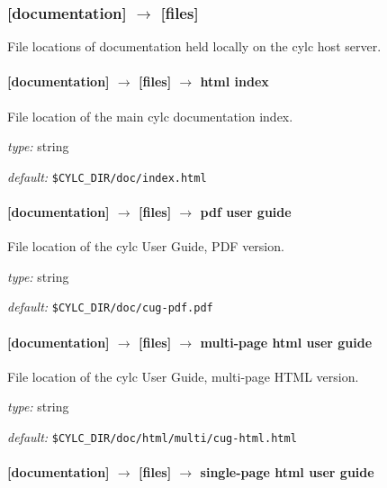 \subsubsection[{[[}files{]]}]{[documentation] $\rightarrow$ [files]}

File locations of documentation held locally on the cylc host server.

\paragraph[html index]{[documentation] $\rightarrow$ [files] $\rightarrow$ html index }

File location of the main cylc documentation index.
\begin{myitemize}
\item {\em type:} string
\item {\em default:} \lstinline=$CYLC_DIR/doc/index.html=
\end{myitemize}

\paragraph[pdf user guide]{[documentation] $\rightarrow$ [files] $\rightarrow$ pdf user guide }

File location of the cylc User Guide, PDF version.
\begin{myitemize}
\item {\em type:} string
\item {\em default:} \lstinline=$CYLC_DIR/doc/cug-pdf.pdf=
\end{myitemize}

\paragraph[multi-page html user guide]{[documentation] $\rightarrow$ [files] $\rightarrow$ multi-page html user guide }

File location of the cylc User Guide, multi-page HTML version.
\begin{myitemize}
\item {\em type:} string
\item {\em default:} \lstinline=$CYLC_DIR/doc/html/multi/cug-html.html=
\end{myitemize}

\paragraph[single-page html user guide]{[documentation] $\rightarrow$ [files] $\rightarrow$ single-page html user guide }

